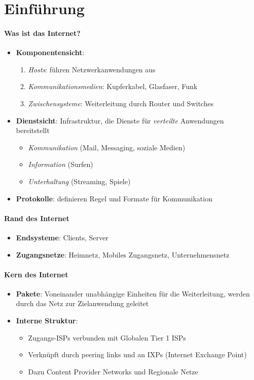 \section{Einführung}

\paragraph{Was ist das Internet?}
\begin{itemize}
  \item \textbf{Komponentensicht}:
  \begin{enumerate}
    \item \emph{Hosts}: führen Netzwerkanwendungen aus
    \item \emph{Kommunikationsmedien}: Kupferkabel, Glasfaser, Funk
    \item \emph{Zwischensysteme}: Weiterleitung durch Router und Switches
  \end{enumerate}
  \item \textbf{Dienstsicht}: Infrastruktur, die Dienste für \emph{verteilte} Anwendungen bereitstellt
  \begin{itemize}
    \item \emph{Kommunikation} (Mail, Messaging, soziale Medien)
    \item \emph{Information} (Surfen)
    \item \emph{Unterhaltung} (Streaming, Spiele)
  \end{itemize}
  \item \textbf{Protokolle}: definieren Regel und Formate für Kommunikation
\end{itemize}

\paragraph{Rand des Internet}
\begin{itemize}
  \item \textbf{Endsysteme}: Clients, Server
  \item \textbf{Zugangsnetze}: Heimnetz, Mobiles Zugangsnetz, Unternehmensnetz
\end{itemize}

\paragraph{Kern des Internet}
\begin{itemize}
  \item \textbf{Pakete}: Voneinander unabhängige Einheiten für die Weiterleitung, werden durch das Netz zur Zielanwendung geleitet
  \item \textbf{Interne Struktur}:
  \begin{itemize}
    \item Zugangs-ISPs verbunden mit Globalen Tier 1 ISPs
    \item Verknüpft durch peering links und an IXPs (Internet Exchange Point)
    \item Dazu Content Provider Networks und Regionale Netze
  \end{itemize}
\end{itemize}

